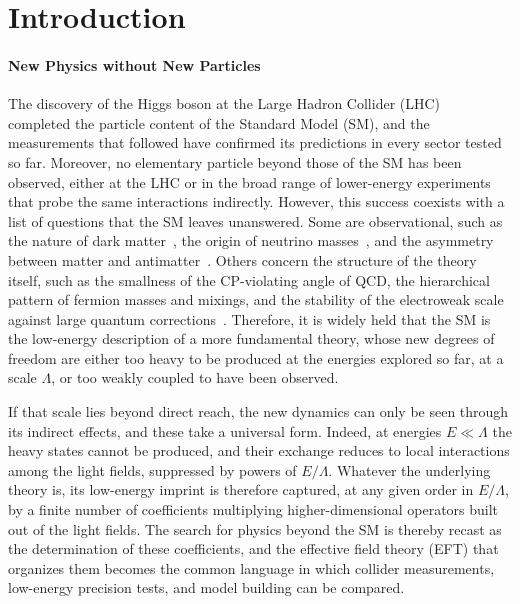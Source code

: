 \chapter{Introduction}
\label{ch:intro}

\subsubsection*{New Physics without New Particles}

The discovery of the Higgs boson at the Large Hadron Collider (LHC)~\cite{ATLAS:2012yve,CMS:2012qbp}
completed the particle content of the Standard Model (SM), and the measurements that followed have
confirmed its predictions in every sector tested so far. Moreover, no elementary particle beyond
those of the SM has been observed, either at the LHC or in the broad range of
lower-energy experiments that probe the same interactions indirectly. However, this success coexists
with a list of questions that the SM leaves unanswered. Some are observational, such as
the nature of dark matter~\cite{Bertone:2004pz,Cirelli:2024ssz}, the origin of neutrino
masses~\cite{Super-Kamiokande:1998kpq,SNO:2002tuh}, and the asymmetry between matter and
antimatter~\cite{Sakharov:1967dj,Planck:2018vyg}. Others concern the structure of the theory itself,
such as the smallness of the CP-violating angle of QCD, the hierarchical
pattern of fermion masses and mixings, and the stability of the electroweak scale against large
quantum corrections~\cite{tHooft:1979rat}. Therefore, it is widely held that the SM is
the low-energy description of a more fundamental theory, whose new degrees of freedom are either too
heavy to be produced at the energies explored so far, at a scale $\Lambda$, or too weakly coupled to
have been observed.

If that scale lies beyond direct reach, the new dynamics can only be seen through its indirect
effects, and these take a universal form. Indeed, at energies $E \ll \Lambda$ the heavy states
cannot be produced, and their exchange reduces to local interactions among the light fields,
suppressed by powers of $E/\Lambda$. Whatever the underlying theory is, its low-energy imprint is
therefore captured, at any given order in $E/\Lambda$, by a finite number of coefficients
multiplying higher-dimensional operators built out of the light fields. The search for physics
beyond the SM is thereby recast as the determination of these coefficients, and the
effective field theory (EFT) that organizes them becomes the common language in which collider
measurements, low-energy precision tests, and model building can be compared.

